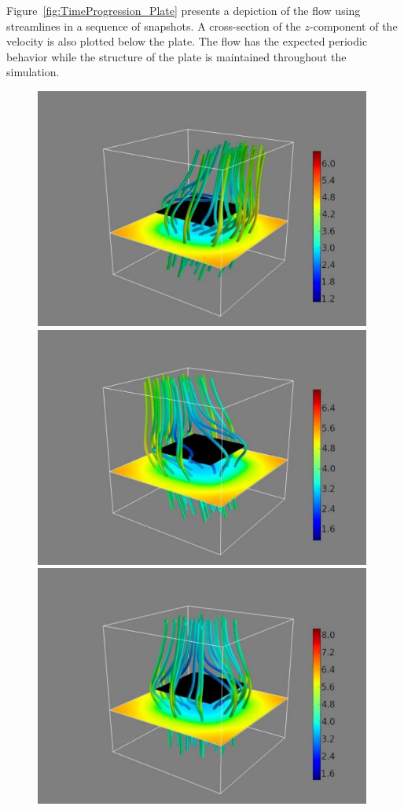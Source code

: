 \documentclass[preprint,12pt]{elsarticle}
\begin{document}
Figure~\ref{fig:TimeProgression_Plate} presents a depiction of the flow using streamlines in a sequence of snapshots. A cross-section of the
 $z$-component of the velocity is also plotted below the plate. The flow has the expected periodic behavior while the structure of the plate is maintained throughout the simulation.
 \begin{figure}[htb]
	\begin{center}
		\includegraphics[bb=.0in .4in 11.5in 6.1in,width=4.355in,clip]{3dplot_50c.pdf}
		\hfill
		\includegraphics[bb=.0in .4in 11.5in 6.1in,width=4.35in,clip]{3dplot_72c.pdf}
		\hfill
		\includegraphics[bb=.0in .4in 11.5in 6.1in,width=4.355in,clip]{3dplot_104c.pdf}

\end{center}
\end{figure}
\end{document}
